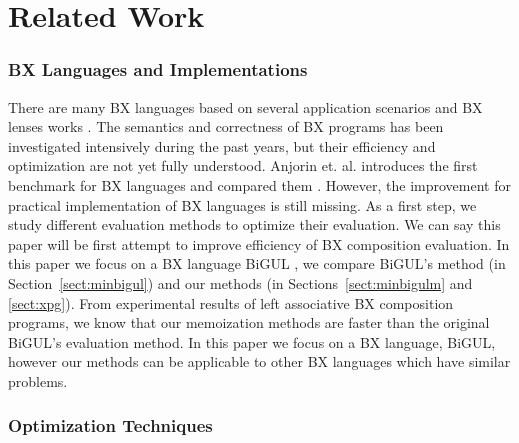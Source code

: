 \section{Related Work} \label{sect:related}

\subsubsection*{BX Languages and Implementations}

There are many BX languages \cite{Buchmann:2018:BFI:3362232.3362263,Ko:2016:BFV:2847538.2847544,LeblebiciAS14,Samimi-Dehkordi18,Cicchetti2011,Hinkel:2019:CPB:3318595.3318634}
based on several application scenarios and BX lenses works \cite{Bohannon06relationallenses:, Bohannon:2008:BRL:1328438.1328487}. The semantics and correctness of BX programs has been investigated intensively during the past years, but their efficiency and optimization are not yet fully understood. Anjorin et. al. introduces the first benchmark for BX languages and compared them \cite{Anjorin2019}. However, the improvement for practical implementation of BX languages is still missing. As a first step, we study different evaluation methods to optimize their evaluation. We can say this paper will be first attempt to improve efficiency of BX composition evaluation. In this paper we focus on a BX language BiGUL \cite{Ko:2016:BFV:2847538.2847544, Ko:2017:ABB:3177123.3158129}, we compare BiGUL's method (in Section~\ref{sect:minbigul}) and our methods (in Sections~\ref{sect:minbigulm} and \ref{sect:xpg}). From experimental results of left associative BX composition programs, we know that our memoization methods are faster than the original BiGUL's evaluation method.
In this paper we focus on a BX language, BiGUL, however our methods can be applicable to other BX languages which have similar problems.


\subsubsection*{Optimization Techniques}

